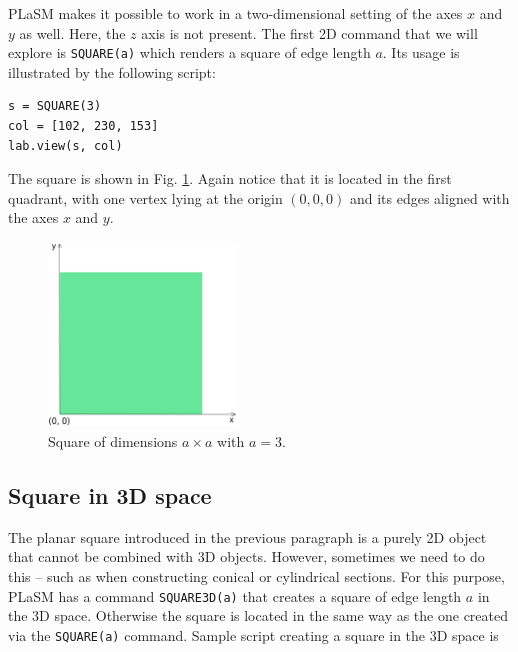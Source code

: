 PLaSM makes it possible to work in a two-dimensional setting of the 
axes $x$ and $y$ as well. Here, the $z$ axis is not present. The first 
2D command that we will explore is {\tt SQUARE(a)} which renders 
a square of edge length $a$. Its usage is illustrated by the 
following script:\\

\begin{bbox}
\begin{verbatim}
s = SQUARE(3)
col = [102, 230, 153]
lab.view(s, col)
\end{verbatim}
\end{bbox}
\vspace{6mm}

\noindent
The square is shown in Fig. \ref{fig:square-111}. Again notice that 
it is located in the first quadrant, with one vertex lying at 
the origin $(0, 0, 0)$ and its edges aligned with the axes $x$ and $y$.

\begin{figure}[!ht]
\begin{center}
\includegraphics[width=0.45\textwidth]{img/square-111.png}
\end{center}
\vspace{-4mm}
\caption{Square of dimensions $a \times a$ with $a = 3$.}
\label{fig:square-111}
\end{figure}
\noindent

\subsection{Square in 3D space}

The planar square introduced in the previous paragraph is a purely 
2D object that cannot be combined with 3D objects. However, sometimes
we need to do this -- such as when constructing conical or cylindrical 
sections. For this purpose, PLaSM has a command {\tt SQUARE3D(a)} that 
creates a square of edge length $a$ in the 3D space. Otherwise the 
square is located in the same way as the one created via the 
{\tt SQUARE(a)} command. Sample script creating a square in the 3D space 
is \\

